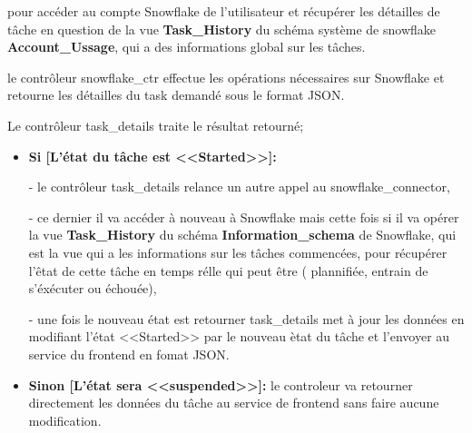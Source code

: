     pour accéder au compte Snowflake de l'utilisateur et récupérer les détailles de tâche en question de la vue \textbf{Task\_History} du schéma système de snowflake \textbf{Account\_Ussage}, qui a des informations global sur les tâches.
    \par le contrôleur snowflake\_ctr effectue les opérations nécessaires sur Snowflake et retourne les détailles du task demandé sous le format JSON.
    \par Le contrôleur task\_details traite le résultat retourné; 
    \begin{itemize}
        \item \textbf{Si [L'état du tâche est <<Started>>]:} 
        \par - le contrôleur task\_details relance un autre appel au snowflake\_connector,
        \par - ce dernier il va accéder à nouveau à Snowflake mais cette fois si il va opérer la vue \textbf{Task\_History} du schéma \textbf{Information\_schema} de Snowflake, qui est la vue qui a les informations sur les tâches commencées, pour récupérer l'êtat de cette tâche en temps rélle qui peut être ( plannifiée, entrain de s'éxécuter ou échouée),
        \par - une fois le nouveau état est retourner task\_details met à jour les données en modifiant l'état <<Started>> par le nouveau ètat du tâche et l'envoyer au service du frontend en fomat JSON.
        \item \textbf{Sinon [L'état sera <<suspended>>]:} le controleur va retourner directement les données du tâche au service de frontend sans faire aucune modification.
    \end{itemize}

